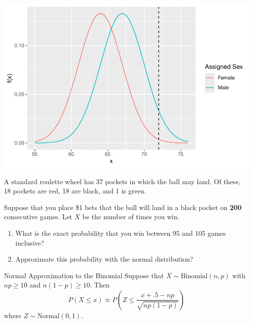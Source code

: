 \begin{frame}

  \begin{block}{\examplectd}
  \begin{center}
    \includegraphics[height = .8\textheight]{figure/exercise-20-1-1}
  \end{center}
  \end{block}
  
\end{frame}

\begin{frame}

  \begin{block}{\example}
     A standard roulette wheel has 37 pockets in which the ball may land. Of these, 18 pockets are red, 18 are black, and 1 is green.

    \bigskip
    
    Suppose that you place \$1 bets that the ball will land in a black pocket on \textbf{200} consecutive games. Let $X$ be the number of times you win.

    \begin{enumerate}[label=\alph*),start=1]
    \item What is the exact probability that you win between 95 and 105 games inclusive?
    \item Approximate this probability with the normal distribution?
    \end{enumerate}
  \end{block}
\end{frame}

\begin{frame}

  \begin{block}{Normal Approximation to the Binomial}
    Suppose that $X \sim \mbox{Binomial}(n,p)$ with $np \geq 10$ and $n(1-p) \geq 10$. Then
    \[
      P(X \leq x) \approx
      P\left(Z \leq \frac{x + .5 - np}{\sqrt{np(1-p)}}\right)
    \]
    where $Z \sim \mbox{Normal}(0,1)$. 
  \end{block}
\end{frame}

